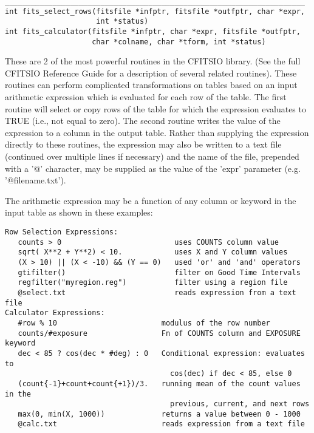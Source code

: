 \documentclass[11pt]{article}
\begin{document}
\begin{verbatim}
_____________________________________________________________________
int fits_select_rows(fitsfile *infptr, fitsfile *outfptr, char *expr,
                     int *status)
int fits_calculator(fitsfile *infptr, char *expr, fitsfile *outfptr,
                    char *colname, char *tform, int *status) 
\end{verbatim}

These are 2 of the most powerful routines in the CFITSIO library.  (See
the full CFITSIO Reference Guide for a description of several related
routines).  These routines can perform complicated transformations on
tables based on an input arithmetic expression which is evaluated for
each row of the table.  The first routine will select or copy rows of
the table for which the expression evaluates to TRUE (i.e., not equal
to zero).  The second routine writes the value of the expression to a
column in the output table.  Rather than supplying the expression
directly to these routines, the expression may also be written to a
text file (continued over multiple lines if necessary) and the name of
the file, prepended with a '@' character, may be supplied as the value
of the 'expr' parameter (e.g.  '@filename.txt').

The arithmetic expression may be a function of any column or keyword in
the input table as shown in these examples:

\begin{verbatim}
Row Selection Expressions:
   counts > 0                          uses COUNTS column value
   sqrt( X**2 + Y**2) < 10.            uses X and Y column values
   (X > 10) || (X < -10) && (Y == 0)   used 'or' and 'and' operators  
   gtifilter()                         filter on Good Time Intervals
   regfilter("myregion.reg")           filter using a region file
   @select.txt                         reads expression from a text file
Calculator Expressions:
   #row % 10                        modulus of the row number
   counts/#exposure                 Fn of COUNTS column and EXPOSURE keyword
   dec < 85 ? cos(dec * #deg) : 0   Conditional expression: evaluates to
                                      cos(dec) if dec < 85, else 0
   (count{-1}+count+count{+1})/3.   running mean of the count values in the
                                      previous, current, and next rows
   max(0, min(X, 1000))             returns a value between 0 - 1000
   @calc.txt                        reads expression from a text file
\end{verbatim}
\end{document}
